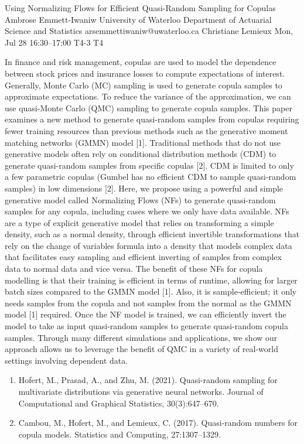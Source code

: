 \begin{talk}
  {Using Normalizing Flows for Efficient Quasi-Random Sampling for Copulas}%
  {Ambrose Emmett-Iwaniw}%
  {University of Waterloo Department of Actuarial Science and Statistics}%
  {arsemmettiwaniw@uwaterloo.ca}%
  {Christiane Lemieux}%
  {}%
  {Mon, Jul 28 16:30--17:00}%
  {T4-3}%
  {T4}%
  
    
   
In finance and risk management, copulas are used to model the dependence between stock prices and insurance losses to compute expectations of interest. Generally, Monte Carlo (MC) sampling is used to generate copula samples to approximate expectations. To reduce the variance of the approximation, we can use quasi-Monte Carlo (QMC) sampling to generate copula samples. This paper examines a new method to generate quasi-random samples from copulas requiring fewer training resources than previous methods such as the generative moment matching networks (GMMN) model [1]. Traditional methods that do not use generative models often rely on conditional distribution methods (CDM) to generate quasi-random samples from specific copulas [2]. CDM is limited to only a few parametric copulas (Gumbel has no efficient CDM to sample quasi-random samples) in low dimensions [2]. Here, we propose using a powerful and simple generative model called Normalizing Flows (NFs) to generate quasi-random samples for any copula, including cases where we only have data available. NFs are a type of explicit generative model that relies on transforming a simple density, such as a normal density, through efficient invertible transformations that rely on the change of variables formula into a density that models complex data that facilitates easy sampling and efficient inverting of samples from complex data to normal data and vice versa. The benefit of these NFs for copula modelling is that their training is efficient in terms of runtime, allowing for larger batch sizes compared to the GMMN model [1]. Also, it is sample-efficient; it only needs samples from the copula and not samples from the normal as the GMMN model [1] required. Once the NF model is trained, we can efficiently invert the model to take as input quasi-random samples to generate quasi-random copula samples. Through many different simulations and applications, we show our approach allows us to leverage the benefit of QMC in a variety of real-world settings involving dependent data.
\medskip

\begin{enumerate}
 \item[{[1]}] Hofert, M., Prasad, A., and Zhu, M. (2021). Quasi-random sampling for multivariate distributions via generative neural networks. Journal of Computational and Graphical Statistics,
30(3):647--670.
 \item[{[2]}] Cambou, M., Hofert, M., and Lemieux, C. (2017). Quasi-random numbers for copula models. Statistics and Computing, 27:1307--1329. 
\end{enumerate}
\end{talk}

